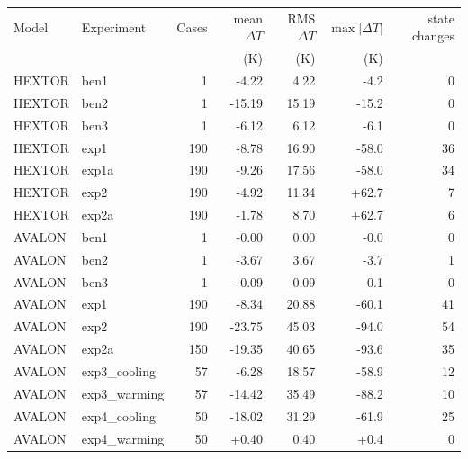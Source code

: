 \small
\begin{tabular}{llrrrrr}
\toprule
Model & Experiment & Cases & mean $\Delta T$ & RMS $\Delta T$ & $\max|\Delta T|$ & state changes \\
 & & & (K) & (K) & (K) & \\
\midrule
HEXTOR & ben1 & 1 & -4.22 & 4.22 & -4.2 & 0 \\
HEXTOR & ben2 & 1 & -15.19 & 15.19 & -15.2 & 0 \\
HEXTOR & ben3 & 1 & -6.12 & 6.12 & -6.1 & 0 \\
HEXTOR & exp1 & 190 & -8.78 & 16.90 & -58.0 & 36 \\
HEXTOR & exp1a & 190 & -9.26 & 17.56 & -58.0 & 34 \\
HEXTOR & exp2 & 190 & -4.92 & 11.34 & +62.7 & 7 \\
HEXTOR & exp2a & 190 & -1.78 & 8.70 & +62.7 & 6 \\
AVALON & ben1 & 1 & -0.00 & 0.00 & -0.0 & 0 \\
AVALON & ben2 & 1 & -3.67 & 3.67 & -3.7 & 1 \\
AVALON & ben3 & 1 & -0.09 & 0.09 & -0.1 & 0 \\
AVALON & exp1 & 190 & -8.34 & 20.88 & -60.1 & 41 \\
AVALON & exp2 & 190 & -23.75 & 45.03 & -94.0 & 54 \\
AVALON & exp2a & 150 & -19.35 & 40.65 & -93.6 & 35 \\
AVALON & exp3\_cooling & 57 & -6.28 & 18.57 & -58.9 & 12 \\
AVALON & exp3\_warming & 57 & -14.42 & 35.49 & -88.2 & 10 \\
AVALON & exp4\_cooling & 50 & -18.02 & 31.29 & -61.9 & 25 \\
AVALON & exp4\_warming & 50 & +0.40 & 0.40 & +0.4 & 0 \\
\bottomrule
\end{tabular}

